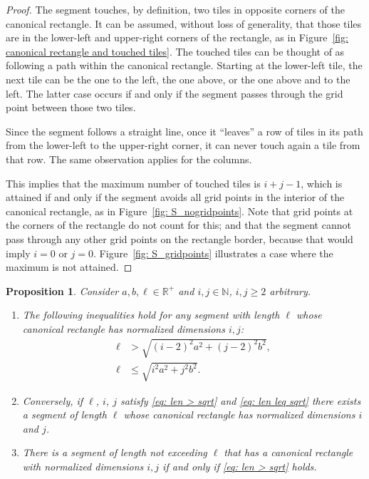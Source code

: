 \documentclass[12pt, a4paper]{article}
\newcommand{\len}{\ell} %
\newtheorem{proposition}{Proposition}%
\begin{document}
\begin{proof}
The segment touches, by definition, two tiles in opposite corners of the canonical rectangle. It can be assumed, without loss of generality, that those tiles are in the lower-left and upper-right corners of the rectangle, as in Figure~\ref{fig: canonical rectangle and touched tiles}. The touched tiles can be thought of as following a path within the canonical rectangle. Starting at the lower-left tile, the next tile can be the one to the left, the one above, or the one above and to the left. The latter case occurs if and only if the segment passes through the grid point between those two tiles.

Since the segment follows a straight line, once it ``leaves'' a row of tiles in its path from the lower-left to the upper-right corner, it can never touch again a tile from that row. The same observation applies for the columns.

This implies that the maximum number of touched tiles is $i+j-1$, which is attained if and only if the segment avoids all grid points in the interior of the canonical rectangle, as in Figure~\ref{fig: S_nogridpoints}. Note that grid points at the corners of the rectangle do not count for this; and that the segment cannot pass through any other grid points on the rectangle border, because that would imply $i=0$ or $j=0$. Figure~\ref{fig: S_gridpoints} illustrates a case where the maximum is not attained.
\end{proof}

\begin{proposition}
\label{prop: len ineq i j}
Consider $a, b, \len \in \mathbb R^+$ and $i, j \in \mathbb N$, $i, j \geq 2$ arbitrary.
\begin{enumerate}
\item
\label{prop: len ineq i j: ineqs}
The following inequalities hold for any segment with length $\len$ whose canonical rectangle has normalized dimensions $i, j$:
\begin{align}
\label{eq: len > sqrt}
\len &> \sqrt{(i-2)^2 a^2 + (j-2)^2 b^2}, \\
\label{eq: len leq sqrt}
\len &\leq \sqrt{i^2 a^2 + j^2 b^2}.
\end{align}
\item
\label{prop: len ineq i j: exist}
Conversely, if $\len$, $i$, $j$ satisfy \eqref{eq: len > sqrt} and \eqref{eq: len leq sqrt} there exists a segment of length $\len$ whose canonical rectangle has normalized dimensions $i$ and $j$.
\item
\label{prop: len ineq i j: ineq, exist}
There is a segment of length not exceeding $\len$ that has a canonical rectangle with normalized dimensions $i, j$ if and only if \eqref{eq: len > sqrt} holds.
\end{enumerate}
\end{proposition}
\end{document}
